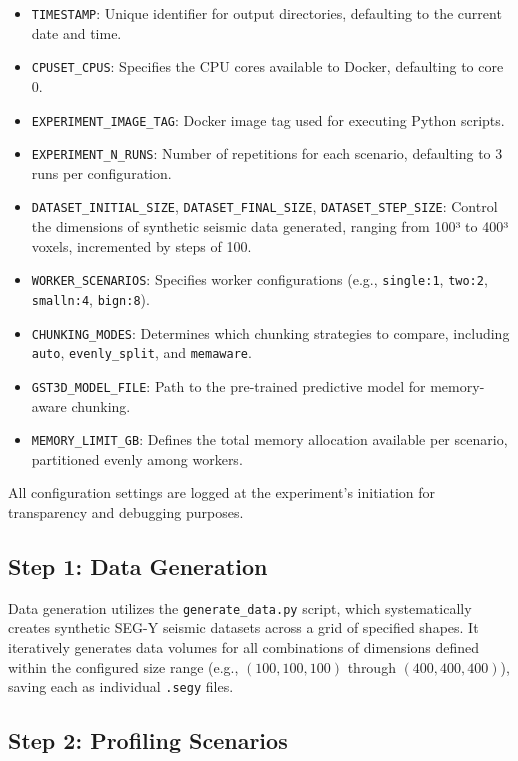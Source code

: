 \begin{itemize}
    \item \texttt{TIMESTAMP}: Unique identifier for output directories, defaulting to the current date and time.
    \item \texttt{CPUSET\_CPUS}: Specifies the CPU cores available to Docker, defaulting to core 0.
    \item \texttt{EXPERIMENT\_IMAGE\_TAG}: Docker image tag used for executing Python scripts.
    \item \texttt{EXPERIMENT\_N\_RUNS}: Number of repetitions for each scenario, defaulting to 3 runs per configuration.
    \item \texttt{DATASET\_INITIAL\_SIZE}, \texttt{DATASET\_FINAL\_SIZE}, \texttt{DATASET\_STEP\_SIZE}: Control the dimensions of synthetic seismic data generated, ranging from 100³ to 400³ voxels, incremented by steps of 100.
    \item \texttt{WORKER\_SCENARIOS}: Specifies worker configurations (e.g., \texttt{single:1}, \texttt{two:2}, \texttt{smalln:4}, \texttt{bign:8}).
    \item \texttt{CHUNKING\_MODES}: Determines which chunking strategies to compare, including \texttt{auto}, \texttt{evenly\_split}, and \texttt{memaware}.
    \item \texttt{GST3D\_MODEL\_FILE}: Path to the pre-trained predictive model for memory-aware chunking.
    \item \texttt{MEMORY\_LIMIT\_GB}: Defines the total memory allocation available per scenario, partitioned evenly among workers.
\end{itemize}

All configuration settings are logged at the experiment’s initiation for transparency and debugging purposes.

\subsection*{Step 1: Data Generation}

Data generation utilizes the \texttt{generate\_data.py} script, which systematically creates synthetic \ac{SEG-Y} seismic datasets across a grid of specified shapes.
It iteratively generates data volumes for all combinations of dimensions defined within the configured size range (e.g., $(100,100,100)$ through $(400,400,400)$), saving each as individual \texttt{.segy} files.

\subsection*{Step 2: Profiling Scenarios}

